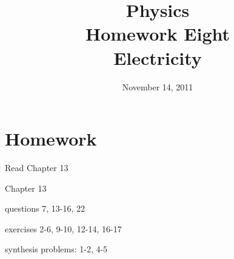 \documentclass{exam}
\title{Physics \\ Homework Eight \\ Electricity}
\date{November 14, 2011}
\begin{document}
\maketitle

\section{Homework}

\begin{itemize*}
  \item Read Chapter 13
  \item Chapter 13
    \begin{itemize*}
      \item questions 7, 13-16, 22
      \item exercises 2-6, 9-10, 12-14, 16-17
      \item synthesis problems: 1-2, 4-5
    \end{itemize*}
\end{itemize*}
\end{document}
